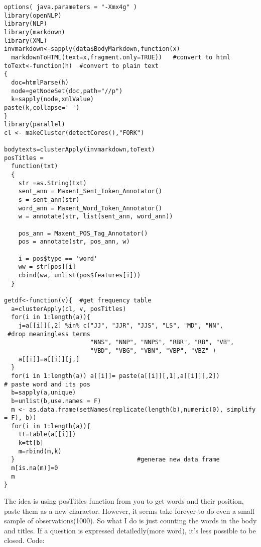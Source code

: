 \documentclass[12pt,a4paper]{article}
\begin{document}
\begin{verbatim}
options( java.parameters = "-Xmx4g" )
library(openNLP)
library(NLP)
library(markdown)
library(XML)
invmarkdown<-sapply(data$BodyMarkdown,function(x)
  markdownToHTML(text=x,fragment.only=TRUE))   #convert to html
toText<-function(h)  #convert to plain text
{
  doc=htmlParse(h)
  node=getNodeSet(doc,path="//p")
  k=sapply(node,xmlValue)
paste(k,collapse=' ')
}
library(parallel)
cl <- makeCluster(detectCores(),"FORK")

bodytexts=clusterApply(invmarkdown,toText)
posTitles =
  function(txt)
  {
    str =as.String(txt)
    sent_ann = Maxent_Sent_Token_Annotator()
    s = sent_ann(str)
    word_ann = Maxent_Word_Token_Annotator()
    w = annotate(str, list(sent_ann, word_ann))

    pos_ann = Maxent_POS_Tag_Annotator()
    pos = annotate(str, pos_ann, w)

    i = pos$type == 'word'
    ww = str[pos][i]
    cbind(ww, unlist(pos$features[i]))
  }

getdf<-function(v){  #get frequency table
  a=clusterApply(cl, v, posTitles)
  for(i in 1:length(a)){
    j=a[[i]][,2] %in% c("JJ", "JJR", "JJS", "LS", "MD", "NN",
 #drop meaningless terms
                        "NNS", "NNP", "NNPS", "RBR", "RB", "VB",
                        "VBD", "VBG", "VBN", "VBP", "VBZ" )
    a[[i]]=a[[i]][j,]
  }
  for(i in 1:length(a)) a[[i]]= paste(a[[i]][,1],a[[i]][,2])
# paste word and its pos
  b=sapply(a,unique)
  b=unlist(b,use.names = F)
  m <- as.data.frame(setNames(replicate(length(b),numeric(0), simplify = F), b))
  for(i in 1:length(a)){
    tt=table(a[[i]])
    k=tt[b]
    m=rbind(m,k)
  }                                  #generae new data frame
  m[is.na(m)]=0
  m
}
\end{verbatim}
The idea is using posTitles function from you to get words and their position, paste them as a new charactor.  However, it seems take forever to do even a small sample of observations(1000). So what I do is just counting the words in the body and titles. If a question is expressed detailedly(more word), it's less possible to be closed.
Code:
\end{document}
